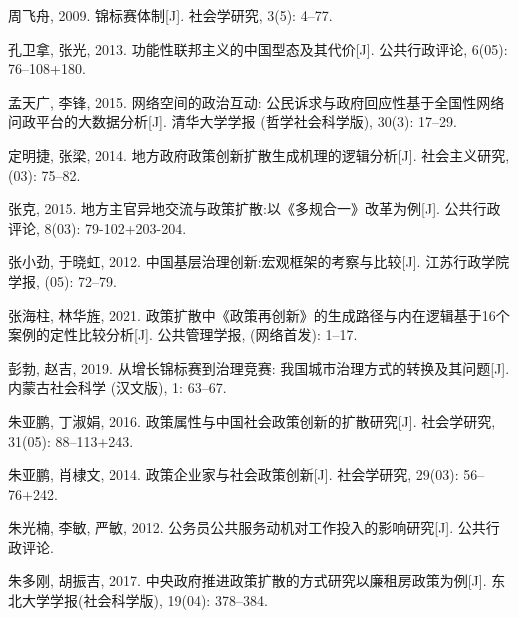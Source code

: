 \documentclass[
  12pt,
]{ctexart}
\newlength{\cslhangindent}
\newlength{\cslentryspacingunit} %
\newenvironment{CSLReferences}[2] %
 {%
  \setlength{\parindent}{0pt}
  \ifodd #1
  \let\oldpar\par
  \def\par{\hangindent=\cslhangindent\oldpar}
  \fi
  \setlength{\parskip}{#2\cslentryspacingunit}
 }%
 {}
\begin{document}
\begin{CSLReferences}{1}{0}
\leavevmode{}%
周飞舟, 2009. 锦标赛体制{[}J{]}. 社会学研究, 3(5): 4--77.

\leavevmode{}%
孔卫拿, 张光, 2013. {功能性联邦主义的中国型态及其代价}{[}J{]}. 公共行政评论, 6(05): 76--108+180.

\leavevmode{}%
孟天广, 李锋, 2015. 网络空间的政治互动: 公民诉求与政府回应性\textemdash\textemdash 基于全国性网络问政平台的大数据分析{[}J{]}. 清华大学学报 (哲学社会科学版), 30(3): 17--29.

\leavevmode{}%
定明捷, 张梁, 2014. {地方政府政策创新扩散生成机理的逻辑分析}{[}J{]}. 社会主义研究, (03): 75--82.

\leavevmode{}%
张克, 2015. {地方主官异地交流与政策扩散:以{《多规合一》}改革为例}{[}J{]}. 公共行政评论, 8(03): 79-102+203-204.

\leavevmode{}%
张小劲, 于晓虹, 2012. {中国基层治理创新:宏观框架的考察与比较}{[}J{]}. 江苏行政学院学报, (05): 72--79.

\leavevmode{}%
张海柱, 林华旌, 2021. {政策扩散中{《政策再创新》}的生成路径与内在逻辑\textemdash\textemdash 基于16个案例的定性比较分析}{[}J{]}. 公共管理学报, (网络首发): 1--17.

\leavevmode{}%
彭勃, 赵吉, 2019. 从增长锦标赛到治理竞赛: 我国城市治理方式的转换及其问题{[}J{]}. 内蒙古社会科学 (汉文版), 1: 63--67.

\leavevmode{}%
朱亚鹏, 丁淑娟, 2016. {政策属性与中国社会政策创新的扩散研究}{[}J{]}. 社会学研究, 31(05): 88--113+243.

\leavevmode{}%
朱亚鹏, 肖棣文, 2014. {政策企业家与社会政策创新}{[}J{]}. 社会学研究, 29(03): 56--76+242.

\leavevmode{}%
朱光楠, 李敏, 严敏, 2012. 公务员公共服务动机对工作投入的影响研究{[}J{]}. 公共行政评论.

\leavevmode{}%
朱多刚, 胡振吉, 2017. 中央政府推进政策扩散的方式研究\textemdash\textemdash 以廉租房政策为例{[}J{]}. 东北大学学报(社会科学版), 19(04): 378--384.


\end{CSLReferences}
\end{document}
